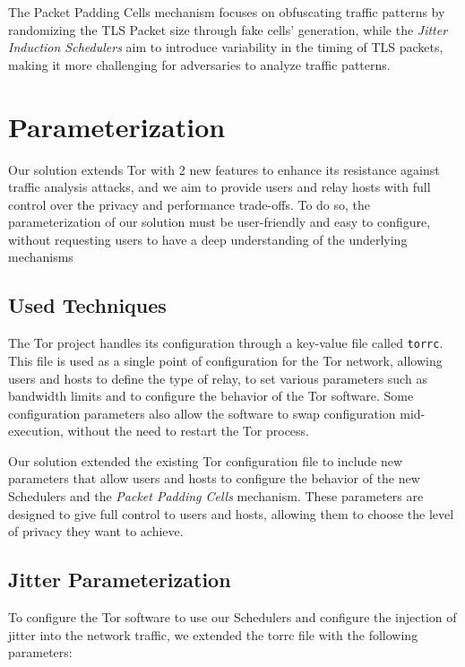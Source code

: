 The Packet Padding Cells mechanism focuses on obfuscating traffic patterns by randomizing the TLS Packet size through fake cells' generation, while the \textit{Jitter Induction Schedulers} aim to introduce variability in the timing of TLS packets, making it more challenging for adversaries to analyze traffic patterns.

\section{Parameterization}\label{sec:parameterization}

Our solution extends Tor with 2 new features to enhance its resistance against traffic analysis attacks, and we aim to provide users and relay hosts with full control over the privacy and performance trade-offs. To do so, the parameterization of our solution must be user-friendly and easy to configure, without requesting users to have a deep understanding of the underlying mechanisms 


\subsection{Used Techniques}\label{sec:used_techniques}

The Tor project handles its configuration through a key-value file called \texttt{torrc}. This file is used as a single point of configuration for the Tor network, allowing users and hosts to define the type of relay, to set various parameters such as bandwidth limits and to configure the behavior of the Tor software. Some configuration parameters also allow the software to swap configuration mid-execution, without the need to restart the Tor process.

Our solution extended the existing Tor configuration file to include new parameters that allow users and hosts to configure the behavior of the new Schedulers and the \textit{Packet Padding Cells} mechanism. These parameters are designed to give full control to users and hosts, allowing them to choose the level of privacy they want to achieve.


\subsection{Jitter Parameterization}\label{sec:jitter_parameterization}

To configure the Tor software to use our Schedulers and configure the injection of jitter into the network traffic, we extended the torrc file with the following parameters: 

